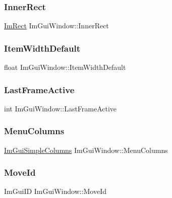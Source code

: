 \subsubsection{\texorpdfstring{Inner\+Rect}{InnerRect}}
{\footnotesize\ttfamily \hyperlink{struct_im_rect}{Im\+Rect} Im\+Gui\+Window\+::\+Inner\+Rect}

\hypertarget{struct_im_gui_window_a5e6be361ee0c71a22a1ff68f6dbf09ff}{}\label{struct_im_gui_window_a5e6be361ee0c71a22a1ff68f6dbf09ff} 
\subsubsection{\texorpdfstring{Item\+Width\+Default}{ItemWidthDefault}}
{\footnotesize\ttfamily float Im\+Gui\+Window\+::\+Item\+Width\+Default}

\hypertarget{struct_im_gui_window_a6f3c194efabb4fd0a99be45fa5fe26f1}{}\label{struct_im_gui_window_a6f3c194efabb4fd0a99be45fa5fe26f1} 
\subsubsection{\texorpdfstring{Last\+Frame\+Active}{LastFrameActive}}
{\footnotesize\ttfamily int Im\+Gui\+Window\+::\+Last\+Frame\+Active}

\hypertarget{struct_im_gui_window_a9207bb87da58863ce60c08679ef19977}{}\label{struct_im_gui_window_a9207bb87da58863ce60c08679ef19977} 
\subsubsection{\texorpdfstring{Menu\+Columns}{MenuColumns}}
{\footnotesize\ttfamily \hyperlink{struct_im_gui_simple_columns}{Im\+Gui\+Simple\+Columns} Im\+Gui\+Window\+::\+Menu\+Columns}

\hypertarget{struct_im_gui_window_a680ac2168da85f59c35de8f0813224d6}{}\label{struct_im_gui_window_a680ac2168da85f59c35de8f0813224d6} 
\subsubsection{\texorpdfstring{Move\+Id}{MoveId}}
{\footnotesize\ttfamily Im\+Gui\+ID Im\+Gui\+Window\+::\+Move\+Id}

